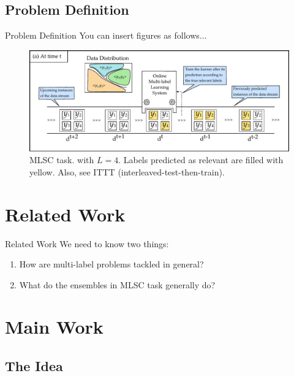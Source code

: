 \documentclass{beamer}
\begin{document}
\subsection{Problem Definition}
\begin{frame}{Problem Definition}
    You can insert figures as follows...
    
    \begin{figure}
        \centering
        \includegraphics[width=\columnwidth]{images/multi-label-stream-classification-fig1.pdf}
        \caption{MLSC task. with $L=4$. Labels predicted as relevant are filled with yellow. Also, see ITTT (interleaved-test-then-train).}
        \label{fig:mlsc}
    \end{figure}
\end{frame}

\section{Related Work}

\begin{frame}{Related Work}
    We need to know two things:
    
    \begin{enumerate}
        \item How are multi-label problems tackled in general?
        \item What do the ensembles in MLSC task generally do?
    \end{enumerate}
\end{frame}


\section{Main Work}

\subsection{The Idea}
\end{document}

